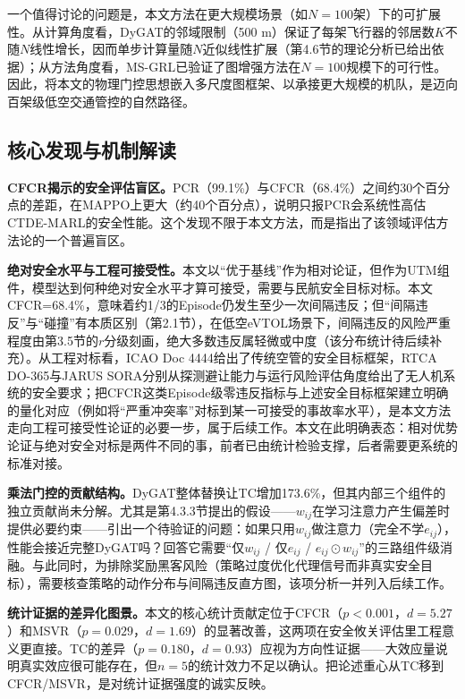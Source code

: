 \documentclass[12pt,a4paper,UTF8]{ctexart}
\begin{document}
一个值得讨论的问题是，本文方法在更大规模场景（如$N=100$架）下的可扩展性。从计算角度看，DyGAT的邻域限制（500 m）保证了每架飞行器的邻居数$K$不随$N$线性增长，因而单步计算量随$N$近似线性扩展（第4.6节的理论分析已给出依据）；从方法角度看，MS-GRL已验证了图增强方法在$N=100$规模下的可行性。因此，将本文的物理门控思想嵌入多尺度图框架、以承接更大规模的机队，是迈向百架级低空交通管控的自然路径。

\subsection{核心发现与机制解读}

\textbf{CFCR揭示的安全评估盲区。}PCR（99.1\%）与CFCR（68.4\%）之间约30个百分点的差距，在MAPPO上更大（约40个百分点），说明只报PCR会系统性高估CTDE-MARL的安全性能。这个发现不限于本文方法，而是指出了该领域评估方法论的一个普遍盲区。

\textbf{绝对安全水平与工程可接受性。}本文以“优于基线”作为相对论证，但作为UTM组件，模型达到何种绝对安全水平才算可接受，需要与民航安全目标对标。本文CFCR=68.4\%，意味着约1/3的Episode仍发生至少一次间隔违反；但“间隔违反”与“碰撞”有本质区别（第2.1节），在低空eVTOL场景下，间隔违反的风险严重程度由第3.5节的$r$分级刻画，绝大多数违反属轻微或中度（该分布统计待后续补充）。从工程对标看，ICAO Doc 4444\cite{ref49}给出了传统空管的安全目标框架，RTCA DO-365\cite{ref51}与JARUS SORA\cite{ref50}分别从探测避让能力与运行风险评估角度给出了无人机系统的安全要求；把CFCR这类Episode级零违反指标与上述安全目标框架建立明确的量化对应（例如将“严重冲突率”对标到某一可接受的事故率水平），是本文方法走向工程可接受性论证的必要一步，属于后续工作。本文在此明确表态：相对优势论证与绝对安全对标是两件不同的事，前者已由统计检验支撑，后者需要更系统的标准对接。

\textbf{乘法门控的贡献结构。}DyGAT整体替换让TC增加173.6\%，但其内部三个组件的独立贡献尚未分解。尤其是第4.3.3节提出的假设——$w_{ij}$在学习注意力产生偏差时提供必要约束——引出一个待验证的问题：如果只用$w_{ij}$做注意力（完全不学$e_{ij}$），性能会接近完整DyGAT吗？回答它需要“仅$w_{ij}$ / 仅$e_{ij}$ / $e_{ij}\odot w_{ij}$”的三路组件级消融。与此同时，为排除奖励黑客风险（策略过度优化代理信号而非真实安全目标），需要核查策略的动作分布与间隔违反直方图，该项分析一并列入后续工作。

\textbf{统计证据的差异化图景。}本文的核心统计贡献定位于CFCR（$p<0.001$，$d=5.27$）和MSVR（$p=0.029$，$d=1.69$）的显著改善，这两项在安全攸关评估里工程意义更直接。TC的差异（$p=0.180$，$d=0.93$）应视为方向性证据——大效应量说明真实效应很可能存在，但$n=5$的统计效力不足以确认。把论述重心从TC移到CFCR/MSVR，是对统计证据强度的诚实反映。
\end{document}
